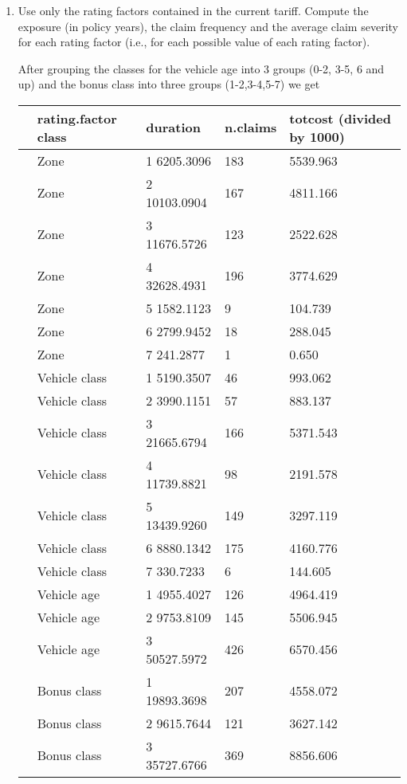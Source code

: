 \documentclass[11pt]{article}
\begin{document}
\begin{enumerate}
\item Use only the rating factors contained in the current tariff. Compute the exposure (in policy years), the claim frequency and the average claim severity for each rating factor (i.e., for each possible value of each rating factor).

 After grouping the classes for the vehicle age into 3 groups  (0-2, 3-5, 6 and up) and the bonus class into three groups (1-2,3-4,5-7) we get

\begin{tabular}{lllll}
\hline
      &rating.factor class  & duration &n.claims & totcost (divided by 1000) \\
      \hline           
      &Zone    & 1  6205.3096    &  183 &  5539.963\\
           &Zone &    2 10103.0904   &   167 &   4811.166\\
           &Zone   &  3 11676.5726   &   123   & 2522.628\\
           &Zone    & 4 32628.4931   &   196   & 3774.629\\
           &Zone    & 5  1582.1123    &    9    & 104.739\\
           &Zone    & 6  2799.9452    &   18   &  288.045\\
           &Zone    & 7   241.2877      &  1     &  0.650\\
 &Vehicle class  &   1  5190.3507     &  46 &    993.062\\
 &Vehicle class   &  2  3990.1151     &  57   &  883.137\\
 &Vehicle class   &  3 21665.6794    &  166  &  5371.543\\
 &Vehicle class   &  4 11739.8821    &   98   & 2191.578\\
 &Vehicle class   &  5 13439.9260   &   149  &  3297.119\\
 &Vehicle class    & 6  8880.1342    &  175   & 4160.776\\
 &Vehicle class   &  7   330.7233      &  6   & 144.605\\
  & Vehicle age   &  1  4955.4027    &  126  &  4964.419\\
   &Vehicle age   &  2  9753.8109    &  145  &  5506.945\\
   &Vehicle age   &  3 50527.5972    &  426 &   6570.456\\
   &Bonus class   &  1 19893.3698   &   207  &  4558.072\\
   &Bonus class   &  2  9615.7644    &  121   & 3627.142\\
   &Bonus class   &  3 35727.6766 &     369   & 8856.606\\
\hline
\end{tabular}


\end{enumerate}
\end{document}
